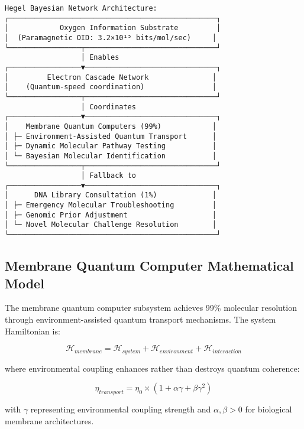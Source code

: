 \documentclass[12pt,a4paper]{article}
\begin{document}
\begin{verbatim}
Hegel Bayesian Network Architecture:
┌─────────────────────────────────────────────────┐
│            Oxygen Information Substrate         │
│  (Paramagnetic OID: 3.2×10¹⁵ bits/mol/sec)     │
└─────────────────┬───────────────────────────────┘
                  │ Enables
┌─────────────────▼───────────────────────────────┐
│         Electron Cascade Network               │
│    (Quantum-speed coordination)                │
└─────────────────┬───────────────────────────────┘
                  │ Coordinates
┌─────────────────▼───────────────────────────────┐
│    Membrane Quantum Computers (99%)            │
│ ├─ Environment-Assisted Quantum Transport      │
│ ├─ Dynamic Molecular Pathway Testing           │
│ └─ Bayesian Molecular Identification           │
└─────────────────┬───────────────────────────────┘
                  │ Fallback to
┌─────────────────▼───────────────────────────────┐
│      DNA Library Consultation (1%)             │
│ ├─ Emergency Molecular Troubleshooting         │
│ ├─ Genomic Prior Adjustment                    │
│ └─ Novel Molecular Challenge Resolution        │
└─────────────────────────────────────────────────┘
\end{verbatim}

\subsection{Membrane Quantum Computer Mathematical Model}

The membrane quantum computer subsystem achieves 99\% molecular resolution through environment-assisted quantum transport mechanisms. The system Hamiltonian is:

\begin{equation}
\mathcal{H}_{membrane} = \mathcal{H}_{system} + \mathcal{H}_{environment} + \mathcal{H}_{interaction}
\end{equation}

where environmental coupling enhances rather than destroys quantum coherence:

\begin{equation}
\eta_{transport} = \eta_0 \times (1 + \alpha \gamma + \beta \gamma^2)
\end{equation}

with $\gamma$ representing environmental coupling strength and $\alpha, \beta > 0$ for biological membrane architectures.
\end{document}
